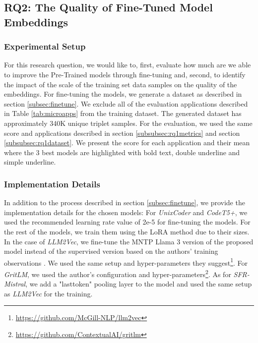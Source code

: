 \subsection{RQ2: The Quality of Fine-Tuned Model Embeddings}\label{subsec:ftmodels}
\subsubsection{Experimental Setup}

For this research question, we would like to, first, evaluate how much are we able to improve the Pre-Trained models through fine-tuning and, second, to identify the impact of the scale of the training set data samples on the quality of the embeddings. For fine-tuning the models, we generate a dataset as described in section \ref{subsec:finetune}. We exclude all of the evaluation applications described in Table \ref{tab:microapps} from the training dataset. The generated dataset has approximately 340K unique triplet samples. For the evaluation, we used the same score and applications described in section \ref{subsubsec:rq1metrics} and section \ref{subsubsec:rq1dataset}. We present the score for each application and their mean where the 3 best models are highlighted with bold text, double underline and simple underline.



\subsubsection{Implementation Details}

In addition to the process described in section \ref{subsec:finetune}, we provide the implementation details for the chosen models: For \textit{UnixCoder} and \textit{CodeT5+}, we used the recommended learning rate value of 2e-5 \cite{chi2019finetunebert} for fine-tuning the models.  For the rest of the models, we train them using the LoRA method due to their sizes. In the case of \textit{LLM2Vec}, we fine-tune the MNTP Llama 3 version of the proposed model \cite{parishad2024llm2vecmntpmodelcard} instead of the supervised version \cite{parishad2024llm2vecsupervisedmodelcard} based on the authors' training observations \cite{parishad2024llm2vec}. We used the same setup and hyper-parameters they suggest\footnote{\url{https://github.com/McGill-NLP/llm2vec}}. For \textit{GritLM}, we used the author's configuration and hyper-parameters\footnote{\url{https://github.com/ContextualAI/gritlm}}. As for \textit{SFR-Mistral}, we add a "lasttoken" pooling layer to the model and used the same setup as \textit{LLM2Vec} for the training. 







